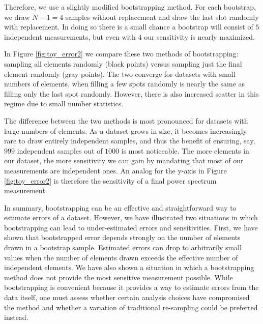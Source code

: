 \documentclass[preprint2,numberedappendix,tighten]{aastex6}  %
\begin{document}
Therefore, we use a slightly modified bootstrapping method. For each bootstrap, we draw $N-1=4$ samples without 
replacement and draw the last slot randomly with replacement. In doing so there is a small chance a bootstrap will consist of 
$5$ independent measurements, but even with $4$ our sensitivity is nearly maximized. 

In Figure \ref{fig:toy_error2} we compare these two methods of bootstrapping: sampling all elements randomly (black points) 
versus sampling just the final element randomly (gray points). The two converge for datasets with small numbers of elements, 
when filling a few spots randomly is nearly the same as filling only the last spot randomly. However, there is also increased 
scatter in this regime due to small number statistics. 

The difference between the two methods is most pronounced for datasets with large numbers of elements. As a dataset grows 
in size, it becomes increasingly rare to draw entirely independent samples, and thus the benefit of ensuring, say, $999$ 
independent samples out of $1000$ is most noticeable. The more elements in our dataset, the more sensitivity we can gain by 
mandating that most of our measurements are independent ones. An analog for the y-axis in Figure \ref{fig:toy_error2} is 
therefore the sensitivity of a final power spectrum measurement.

In summary, bootstrapping can be an effective and straightforward way to estimate errors of a dataset. However, we have 
illustrated two situations in which bootstrapping can lead to under-estimated errors and sensitivities. First, we have shown that 
bootstrapped error depends strongly on the number of elements drawn in a bootstrap sample. Estimated errors can drop to 
arbitrarily small values when the number of elements drawn exceeds the effective number of independent elements. We have 
also shown a situation in which a bootstrapping method does not provide the most sensitive measurement possible. While 
bootstrapping is convenient because it provides a way to estimate errors from the data itself, one must assess whether certain 
analysis choices have compromised the method and whether a variation of traditional re-sampling could be preferred instead.
\end{document}
